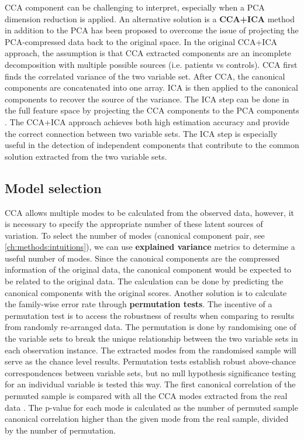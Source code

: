 CCA component can be challenging to interpret, especially when a PCA dimension reduction is applied. An alternative solution is a \textbf{CCA+ICA} method in addition to the PCA \cite{MillerK2016,Sui2010} has been proposed to overcome the issue of projecting the PCA-compressed data back to the original space. In the original CCA+ICA approach, the assumption is that CCA extracted components are an incomplete decomposition with multiple possible sources (i.e. patients vs controls). CCA first finds the correlated variance of the two variable set. After CCA, the canonical components are concatenated into one array. ICA is then applied to the canonical components to recover the source of the variance. The ICA step can be done in the full feature space by projecting the CCA components to the PCA components \cite{MillerK2016}. The CCA+ICA approach achieves both high estimation accuracy and provide the correct connection between two variable sets. The ICA step is especially useful in the detection of independent components that contribute to the common solution extracted from the two variable sets.

\subsection{Model selection}
CCA allows multiple modes to be calculated from the observed data, however, it is necessary to specify the appropriate number of these latent sources of variation. To select the number of modes (canonical component pair, see \cref{ch:methods:intuitions}), we can use \textbf{explained variance} metrics to determine a useful number of modes. Since the canonical components are the compressed information of the original data, the canonical component would be expected to be related to the original data. The calculation can be done by predicting the canonical components with the original scores. Another solution is to calculate the family-wise error rate through \textbf{permutation tests}. The incentive of a permutation test is to access the robustness of results when comparing to results from randomly re-arranged data. The permutation is done by randomising one of the variable sets to break the unique relationship between the two variable sets in each observation instance. The extracted modes from the randomised sample will serve as the chance level results. Permutation tests establish robust above-chance correspondences between variable sets, but no null hypothesis significance testing for an individual variable is tested this way. The first canonical correlation of the permuted sample is compared with all the CCA modes extracted from the real data . The p-value for each mode is calculated as the number of permuted sample canonical correlation higher than the given mode from the real sample, divided by the number of permutation.

